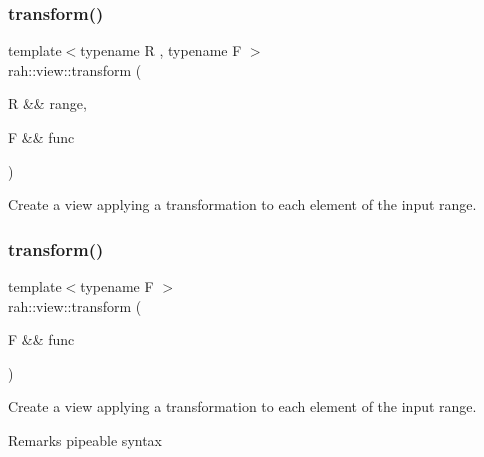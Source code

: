 \subsubsection{\texorpdfstring{transform()}{transform()}\hspace{0.1cm}{\footnotesize\ttfamily [1/2]}}
{\footnotesize\ttfamily template$<$typename R , typename F $>$ \\
rah\+::view\+::transform (\begin{DoxyParamCaption}\item[{R \&\&}]{range,  }\item[{F \&\&}]{func }\end{DoxyParamCaption})}



Create a view applying a transformation to each element of the input range. 


\begin{DoxyCodeInclude}{0}
\end{DoxyCodeInclude}
\mbox{\label{namespacerah_1_1view_a814771afc1cfedc6418915550bcd5bbd}} 
\subsubsection{\texorpdfstring{transform()}{transform()}\hspace{0.1cm}{\footnotesize\ttfamily [2/2]}}
{\footnotesize\ttfamily template$<$typename F $>$ \\
rah\+::view\+::transform (\begin{DoxyParamCaption}\item[{F \&\&}]{func }\end{DoxyParamCaption})}



Create a view applying a transformation to each element of the input range. 

\begin{DoxyRemark}{Remarks}
pipeable syntax
\end{DoxyRemark}

